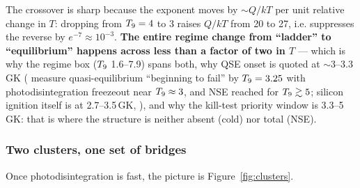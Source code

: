 The crossover is sharp because the exponent moves by ${\sim}Q/kT$ per unit
relative change in $T$: dropping from $T_{9} = 4$ to 3 raises $Q/kT$ from 20 to
27, i.e. suppresses the reverse by $e^{-7} \approx 10^{-3}$. \textbf{The entire
regime change from ``ladder'' to ``equilibrium'' happens across less than a
factor of two in $T$} --- which is why the regime box ($T_{9}$ 1.6--7.9) spans
both, why QSE onset is quoted at ${\sim}3$--3.3\,GK (\citealp{ht1999a} measure
quasi-equilibrium ``beginning to fail'' by $T_{9} = 3.25$ with photodisintegration
freezeout near $T_{9} \approx 3$, and NSE reached for $T_{9} \gtrsim 5$; silicon
ignition itself is at 2.7--3.5\,GK, \citealp{woosleyjanka2005}), and why the
kill-test priority window is 3.3--5\,GK: that is where the structure is neither
absent (cold) nor total (NSE).

\subsubsection{Two clusters, one set of bridges}
\label{sec:twoclusters}

Once photodisintegration is fast, the picture is Figure~\ref{fig:clusters}.


